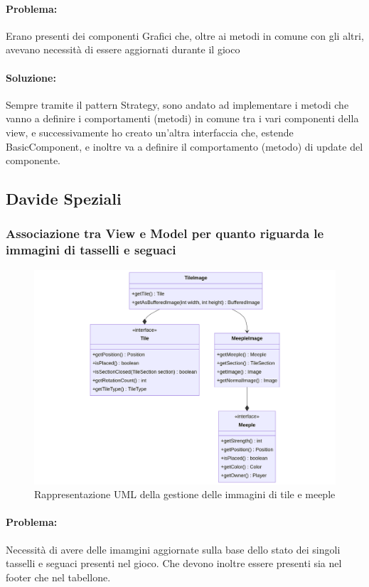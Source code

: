 \paragraph{Problema:}
Erano presenti dei componenti Grafici che, oltre ai metodi in comune con gli altri, avevano necessità di essere aggiornati durante il gioco
\paragraph{Soluzione:}
Sempre tramite il pattern Strategy, sono andato ad implementare i metodi che vanno a definire i comportamenti (metodi) in comune tra i vari componenti della view, e successivamente ho creato un'altra interfaccia che, estende BasicComponent, e inoltre va a definire il comportamento (metodo) di update del componente.
\clearpage

\subsection*{Davide Speziali}


\subsubsection*{Associazione tra View e Model per quanto riguarda le immagini di tasselli e seguaci}
\begin{figure}[h]
    \centering\includegraphics[scale=.4]{images/uml_tilemeeple_images.png}
    \caption{Rappresentazione UML della gestione delle immagini di tile e meeple}
\end{figure}
\paragraph{Problema:}
Necessità di avere delle imamgini aggiornate sulla base dello stato dei singoli tasselli e seguaci presenti nel gioco. Che devono inoltre essere presenti
sia nel footer che nel tabellone.
